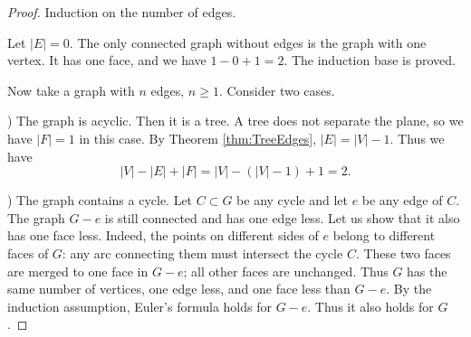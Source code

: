 
\begin{proof}
Induction on the number of edges.

Let $|E| = 0$. The only connected graph without edges is the graph with one vertex.
It has one face, and we have $1 - 0 + 1 = 2$. The induction base is proved.

Now take a graph with $n$ edges, $n \ge 1$.
Consider two cases.

) The graph is acyclic.
Then it is a tree. A tree does not separate the plane, so we have $|F| = 1$ in this case.
By Theorem \ref{thm:TreeEdges}, $|E| = |V|-1$.
Thus we have
\[
|V| - |E| + |F| = |V| - (|V|-1) + 1 = 2.
\]

) The graph contains a cycle.
Let $C \subset G$ be any cycle and let $e$ be any edge of $C$.
The graph $G - e$ is still connected and has one edge less.
Let us show that it also has one face less.
Indeed, the points on different sides of $e$ belong to different faces of $G$:
any arc connecting them must intersect the cycle $C$.
These two faces are merged to one face in $G - e$; all other faces are unchanged.
Thus $G$ has the same number of vertices, one edge less, and one face less than $G - e$.
By the induction assumption, Euler's formula holds for $G - e$.
Thus it also holds for $G$.
\end{proof}

